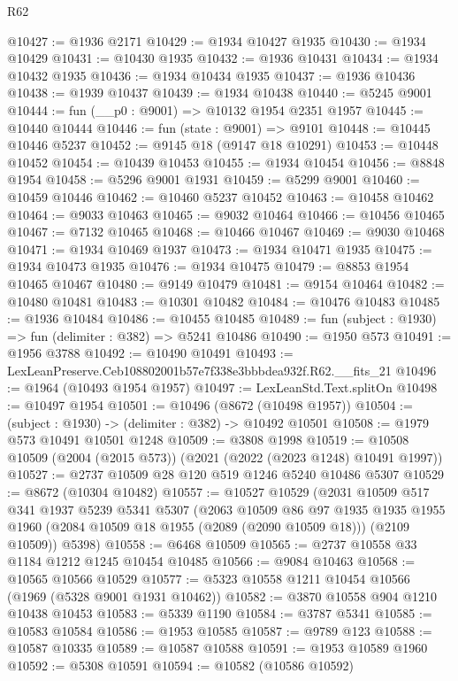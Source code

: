 \begin{lexlean}{R62}
\begin{coremodule}
@10427 := @1936 @2171
@10429 := @1934 @10427 @1935
@10430 := @1934 @10429
@10431 := @10430 @1935
@10432 := @1936 @10431
@10434 := @1934 @10432 @1935
@10436 := @1934 @10434 @1935
@10437 := @1936 @10436
@10438 := @1939 @10437
@10439 := @1934 @10438
@10440 := @5245 @9001
@10444 := fun (__p0 : @9001) => @10132 @1954 @2351 @1957
@10445 := @10440 @10444
@10446 := fun (state : @9001) => @9101
@10448 := @10445 @10446 @5237
@10452 := @9145 @18 (@9147 @18 @10291)
@10453 := @10448 @10452
@10454 := @10439 @10453
@10455 := @1934 @10454
@10456 := @8848 @1954
@10458 := @5296 @9001 @1931
@10459 := @5299 @9001
@10460 := @10459 @10446
@10462 := @10460 @5237 @10452
@10463 := @10458 @10462
@10464 := @9033 @10463
@10465 := @9032 @10464
@10466 := @10456 @10465
@10467 := @7132 @10465
@10468 := @10466 @10467
@10469 := @9030 @10468
@10471 := @1934 @10469 @1937
@10473 := @1934 @10471 @1935
@10475 := @1934 @10473 @1935
@10476 := @1934 @10475
@10479 := @8853 @1954 @10465 @10467
@10480 := @9149 @10479
@10481 := @9154 @10464
@10482 := @10480 @10481
@10483 := @10301 @10482
@10484 := @10476 @10483
@10485 := @1936 @10484
@10486 := @10455 @10485
@10489 := fun (subject : @1930) => fun (delimiter : @382) => @5241 @10486
@10490 := @1950 @573
@10491 := @1956 @3788
@10492 := @10490 @10491
@10493 := LexLeanPreserve.Ceb108802001b57e7f338e3bbbdea932f.R62.__fits_21
@10496 := @1964 (@10493 @1954 @1957)
@10497 := LexLeanStd.Text.splitOn
@10498 := @10497 @1954
@10501 := @10496 (@8672 (@10498 @1957))
@10504 := (subject : @1930) -> (delimiter : @382) -> @10492 @10501
@10508 := @1979 @573 @10491 @10501 @1248
@10509 := @3808 @1998
@10519 := @10508 @10509 (@2004 (@2015 @573)) (@2021 (@2022 (@2023 @1248) @10491 @1997))
@10527 := @2737 @10509 @28 @120 @519 @1246 @5240 @10486 @5307
@10529 := @8672 (@10304 @10482)
@10557 := @10527
    @10529
    (@2031
      @10509
      @517
      @341
      @1937
      @5239
      @5341
      @5307
      (@2063
        @10509
        @86
        @97
        @1935
        @1935
        @1955
        @1960
        (@2084 @10509 @18 @1955 (@2089 (@2090 @10509 @18)))
        (@2109 @10509))
      @5398)
@10558 := @6468 @10509
@10565 := @2737 @10558 @33 @1184 @1212 @1245 @10454 @10485
@10566 := @9084 @10463
@10568 := @10565 @10566 @10529
@10577 := @5323 @10558 @1211 @10454 @10566 (@1969 (@5328 @9001 @1931 @10462))
@10582 := @3870 @10558 @904 @1210 @10438 @10453
@10583 := @5339 @1190
@10584 := @3787 @5341
@10585 := @10583 @10584
@10586 := @1953 @10585
@10587 := @9789 @123
@10588 := @10587 @10335
@10589 := @10587 @10588
@10591 := @1953 @10589 @1960
@10592 := @5308 @10591
@10594 := @10582 (@10586 @10592)

\end{coremodule}
\end{lexlean}
